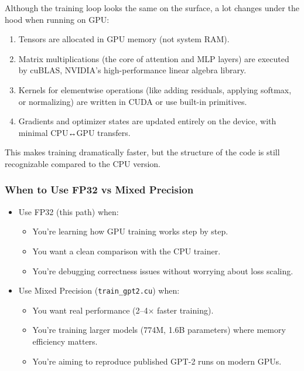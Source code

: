 \documentclass[
  letterpaper,
  DIV=11,
  numbers=noendperiod]{scrreprt}
\providecommand{\tightlist}{%
  \setlength{\itemsep}{0pt}\setlength{\parskip}{0pt}}
\begin{document}
Although the training loop looks the same on the surface, a lot changes
under the hood when running on GPU:

\begin{enumerate}
\def\labelenumi{\arabic{enumi}.}
\tightlist
\item
  Tensors are allocated in GPU memory (not system RAM).
\item
  Matrix multiplications (the core of attention and MLP layers) are
  executed by cuBLAS, NVIDIA's high-performance linear algebra library.
\item
  Kernels for elementwise operations (like adding residuals, applying
  softmax, or normalizing) are written in CUDA or use built-in
  primitives.
\item
  Gradients and optimizer states are updated entirely on the device,
  with minimal CPU↔GPU transfers.
\end{enumerate}

This makes training dramatically faster, but the structure of the code
is still recognizable compared to the CPU version.

\subsubsection{When to Use FP32 vs Mixed
Precision}\label{when-to-use-fp32-vs-mixed-precision}

\begin{itemize}
\item
  Use FP32 (this path) when:

  \begin{itemize}
  \tightlist
  \item
    You're learning how GPU training works step by step.
  \item
    You want a clean comparison with the CPU trainer.
  \item
    You're debugging correctness issues without worrying about loss
    scaling.
  \end{itemize}
\item
  Use Mixed Precision (\texttt{train\_gpt2.cu}) when:

  \begin{itemize}
  \tightlist
  \item
    You want real performance (2--4× faster training).
  \item
    You're training larger models (774M, 1.6B parameters) where memory
    efficiency matters.
  \item
    You're aiming to reproduce published GPT-2 runs on modern GPUs.
  \end{itemize}
\end{itemize}
\end{document}
